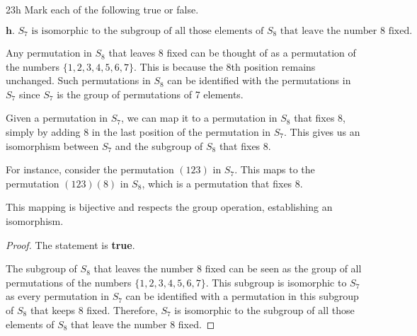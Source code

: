 \documentclass[12pt]{amsart}
\theoremstyle{definition}
\numberwithin{equation}{section}
\theoremstyle{plain}
\begin{document}
\begin{exercise}{23h} Mark each of the following true or false.

    \(\textbf{h. } S_7 \text{ is isomorphic to the subgroup of all those elements of $S_8$ that leave the number $8$ fixed.}\)

Any permutation in \( S_8 \) that leaves 8 fixed can be thought of as a permutation of the numbers \( \{1, 2, 3, 4, 5, 6, 7\} \). This is because the 8th position remains unchanged. Such permutations in \( S_8 \) can be identified with the permutations in \( S_7 \) since \( S_7 \) is the group of permutations of 7 elements.

Given a permutation in \( S_7 \), we can map it to a permutation in \( S_8 \) that fixes 8, simply by adding 8 in the last position of the permutation in \( S_7 \). This gives us an isomorphism between \( S_7 \) and the subgroup of \( S_8 \) that fixes 8.

For instance, consider the permutation \( (1 2 3) \) in \( S_7 \). This maps to the permutation \( (1 2 3)(8) \) in \( S_8 \), which is a permutation that fixes 8.

This mapping is bijective and respects the group operation, establishing an isomorphism.

\begin{proof}
The statement is \textbf{true}.

The subgroup of \( S_8 \) that leaves the number 8 fixed can be seen as the group of all permutations of the numbers \( \{1, 2, 3, 4, 5, 6, 7\} \). This subgroup is isomorphic to \( S_7 \) as every permutation in \( S_7 \) can be identified with a permutation in this subgroup of \( S_8 \) that keeps 8 fixed. Therefore, \( S_7 \) is isomorphic to the subgroup of all those elements of \( S_8 \) that leave the number 8 fixed.
\end{proof}
\end{exercise}
\vspace*{20pt}
\end{document}
